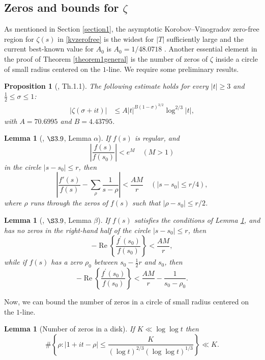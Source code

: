 \documentclass[reqno]{amsart}
\newtheorem{lemma}[theorem]{Lemma}
\newtheorem{proposition}[theorem]{Proposition}
\numberwithin{equation}{section}
\theoremstyle{remark}
\begin{document}
\subsection{Zeros and bounds for $\zeta$}As mentioned in Section \ref{section1}, the asymptotic Korobov--Vinogradov zero-free region for $\zeta(s)$ in \eqref{kvzerofree} is the widest for $|T|$ sufficiently large and the current best-known value for $A_0$ is $A_0=1/48.0718$ \cite{bellotti2023explicit}.
Another essential element in the proof of Theorem \ref{theorem1general} is the number of zeros of $\zeta$ inside a circle of small radius centered on the $1$-line. We require some preliminary results.
\begin{proposition}[\cite{bellotti2023explicit}, Th.1.1]\label{mybound}
    The following estimate holds for every $|t|\ge 3$ and $\frac{1}{2}\le \sigma\le 1$:
\begin{equation*}
    \begin{aligned}
    |\zeta(\sigma+it)|&\le A |t|^{B
    (1-\sigma)^{3/2}}\log^{2/3}|t|,
    \end{aligned}
\end{equation*}with $A=70.6995$ and $B=4.43795$.
\end{proposition}
\begin{lemma}[\cite{titchmarsh_theory_1986}, $\S 3.9$, Lemma $\alpha$]\label{lemmaalpha}
    If $f(s)$ is regular, and
    \[
    \left|\frac{f(s)}{f(s_0)}\right|<e^M\quad (M>1)
    \]
    in the circle $|s-s_0|\le r$, then 
    \[
    \left|\frac{f'(s)}{f(s)}-\sum_\rho\frac{1}{s-\rho}\right|<\frac{AM}{r}\quad (|s-s_0|\le r/4),
    \]
    where $\rho$ runs through the zeros of $f(s)$ such that $|\rho-s_0|\le r/2$.
\end{lemma}
\begin{lemma}[\cite{titchmarsh_theory_1986}, $\S 3.9$, Lemma $\beta$]\label{lemmabeta}
 If $f(s)$ satisfies the conditions of Lemma \ref{lemmaalpha}, and has no zeros in the right-hand half of the circle $\left|s-s_0\right| \leq r$, then
$$
-\operatorname{Re}\left\{\frac{f^{\prime}\left(s_0\right)}{f\left(s_0\right)}\right\}<\frac{A M}{r},
$$
while if $f(s)$ has a zero $\rho_0$ between $s_0-\frac{1}{2} r$ and $s_0$, then
$$
-\operatorname{Re}\left\{\frac{f^{\prime}\left(s_0\right)}{f\left(s_0\right)}\right\}<\frac{A M}{r}-\frac{1}{s_0-\rho_0}.
$$
\end{lemma}
Now, we can bound the number of zeros in a circle of small radius centered on the $1$-line.
\begin{lemma}[Number of zeros in a disk]\label{numberzerosdisknew}
 If $K \ll \log \log t$ then
$$
\#\left\{\rho:|1+i t-\rho| \leq \frac{K}{(\log t)^{2 / 3}(\log \log t)^{1 / 3}}\right\} \ll K.
$$
\end{lemma}
\end{document}
